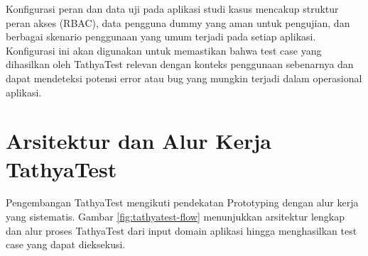 Konfigurasi peran dan data uji pada aplikasi studi kasus mencakup struktur peran akses (RBAC), data pengguna dummy yang aman untuk pengujian, dan berbagai skenario penggunaan yang umum terjadi pada setiap aplikasi. Konfigurasi ini akan digunakan untuk memastikan bahwa test case yang dihasilkan oleh TathyaTest relevan dengan konteks penggunaan sebenarnya dan dapat mendeteksi potensi error atau bug yang mungkin terjadi dalam operasional aplikasi.

\section{Arsitektur dan Alur Kerja TathyaTest}\label{arsitektur-tathyatest}

Pengembangan TathyaTest mengikuti pendekatan Prototyping dengan alur kerja yang sistematis. Gambar \ref{fig:tathyatest-flow} menunjukkan arsitektur lengkap dan alur proses TathyaTest dari input domain aplikasi hingga menghasilkan test case yang dapat dieksekusi.

